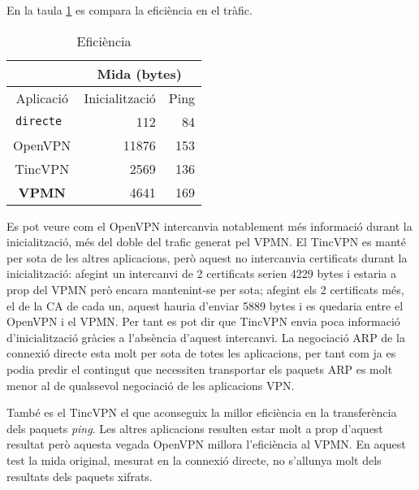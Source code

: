 En la taula \ref{T:efi} es compara la eficiència en el tràfic.
\begin{table}[htb]
\begin{center}
\begin{tabular}{|c|r|r|}
\multicolumn{1}{c}{} & \multicolumn{2}{|c|}{Mida (bytes)} \\ \hline
Aplicació & Inicialització & Ping \\ \hline \hline
\tt directe & 112 & 84 \\ \hline
OpenVPN & 11876 & 153 \\ \hline
TincVPN & 2569 & 136 \\ \hline
\bf VPMN & 4641 & 169 \\ \hline
\end{tabular}
\end{center}
\begin{center}
\caption{Eficiència}
\label{T:efi}
\end{center}
\end{table}
Es pot veure com el OpenVPN intercanvia notablement més informació durant la inicialització, més del doble del trafic generat pel VPMN.
El TincVPN es manté per sota de les altres aplicacions, però aquest no intercanvia certificats durant la inicialització: afegint un intercanvi de 2 certificats serien 4229 bytes i estaria a prop del VPMN però encara mantenint-se per sota; afegint els 2 certificats més, el de la CA de cada un, aquest hauria d'enviar 5889 bytes i es quedaria entre el OpenVPN i el VPMN. Per tant es pot dir que TincVPN envia poca informació d'inicialització gràcies a l'absència d'aquest intercanvi.
La negociació ARP de la connexió directe esta molt per sota de totes les aplicacions, per tant com ja es podia predir el contingut que necessiten transportar els paquets ARP es molt menor al de qualssevol negociació de les aplicacions VPN.

També es el TincVPN el que aconseguix la millor eficiència en la transferència dels paquets \emph{ping}. Les altres aplicacions resulten estar molt a prop d'aquest resultat però aquesta vegada OpenVPN millora l'eficiència al VPMN. En aquest test la mida original, mesurat en la connexió directe, no s'allunya molt dels resultats dels paquets xifrats.


